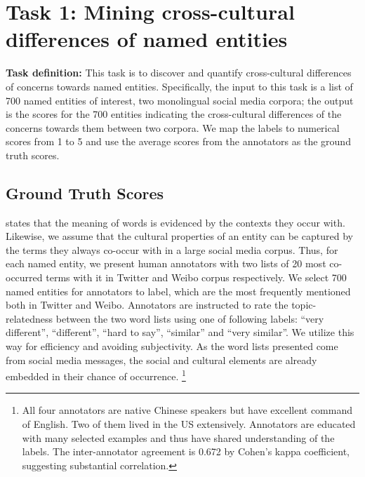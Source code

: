 \section{Task 1: Mining cross-cultural differences of named entities}
\label{sec:mcdne}

\textbf{Task definition:}
	This task is to discover and quantify cross-cultural differences of concerns towards named entities.  
	Specifically, the input to this task is a list of 700 named entities of interest, two monolingual social media corpora; the output is the scores for the 700 entities indicating the cross-cultural differences of the concerns towards them between two corpora. 
	We map the labels to numerical scores from 1 to 5 and use the average scores from the annotators as the ground truth {scores}. 

\subsection{Ground Truth Scores}
\label{sec:mcdne_truth}
\citet{harris1954distributional} states that the meaning of 
words is evidenced by the contexts they occur with. 
Likewise, we assume that the cultural properties of an entity 
can be captured by the terms they always co-occur with in a large social media corpus. 
Thus, for each named entity, we present human annotators with two lists of 20 most co-occurred terms with it in Twitter and Weibo corpus respectively. 
We select 700 named entities for annotators to label, which
are the most frequently mentioned both in Twitter and Weibo. 
Annotators are instructed to rate the topic-relatedness between the 
two word lists using one of following labels: ``very different'', 
``different'', ``hard to say'',  ``similar'' and 
``very similar''. We utilize this way for efficiency and avoiding subjectivity. 
As the word lists presented come from social media messages, the social and cultural elements are already embedded in their chance of occurrence.
\footnote{All four annotators are native Chinese speakers 
but have excellent command of English. Two of them lived in the US extensively. 
Annotators are educated with many 
selected examples and thus have shared understanding of the
labels. The inter-annotator agreement is 0.672 by Cohen's kappa coefficient, 
suggesting substantial correlation.} 



